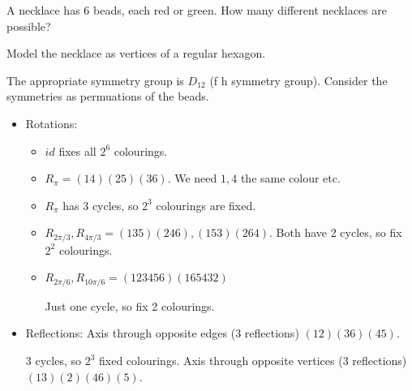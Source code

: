 \documentclass{article}
\theoremstyle{definition} \newtheorem*{definition}{Definition}
\begin{document}
\begin{exmps} A necklace has 6 beads, each red or green. How many different
  necklaces are possible?

  Model the necklace as vertices of a regular hexagon.

  The appropriate symmetry group is $D_{12}$ (f h symmetry group). Consider the
  symmetries as permuations of the beads.

  \begin{itemize} \item Rotations: \begin{itemize} \item $id$ fixes all $2^6$
          colourings.  \item $R_\pi = (14)(25)(36)$.  We need $1,4$ the same
          colour etc.  \item $R_\pi$ has 3 cycles, so $2^3$ colourings are
            fixed.

      \item $R_{2\pi/3},R_{4\pi/3}=(135)(246),(153)(264)$.  Both have 2 cycles,
      so fix $2^2$ colourings.  \item $R_{2\pi/6},R_{10\pi/6}=(123456)(165432)$

       Just one cycle, so fix 2 colourings.  \end{itemize}
      

     \item Reflections: Axis through opposite edges (3 reflections)
       $(12)(36)(45)$. 
       \begin{figure}[h] \centering {}

         \label{fig:necklace1} \end{figure}
      
       
       3 cycles, so $2^3$ fixed colourings. 
Axis through opposite vertices (3 reflections) $(13)(2)(46)(5)$.

       \begin{figure}[h] \centering {}


\end{figure}
\end{itemize}
\end{exmps}
\end{document}

